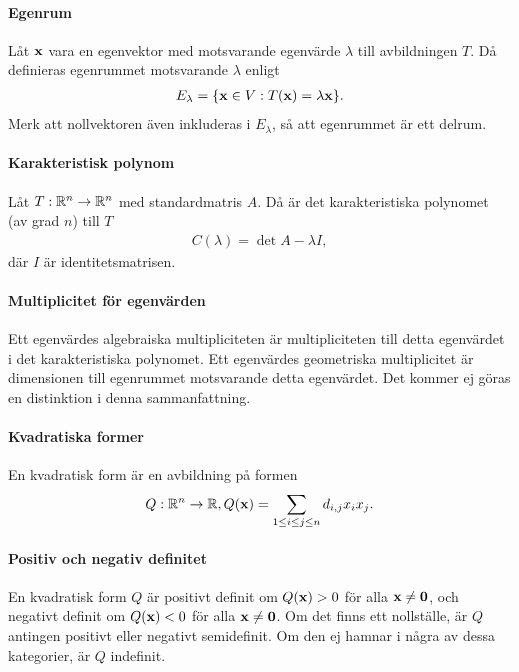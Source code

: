 \paragraph{Egenrum}
Låt $\vect{x}$ vara en egenvektor med motsvarande egenvärde $\lambda$ till avbildningen $T$. Då definieras egenrummet motsvarande $\lambda$ enligt
\begin{align*}
	E_\lambda = \{\vect{x}\in V: T(\vect{x}) = \lambda\vect{x}\}.
\end{align*}
Merk att nollvektoren även inkluderas i $E_\lambda$, så att egenrummet är ett delrum.

\paragraph{Karakteristisk polynom}
Låt $T: \mathbb{R}^n\to\mathbb{R}^n$ med standardmatris $A$. Då är det karakteristiska polynomet (av grad $n$) till $T$
\begin{align*}
	C(\lambda) = \det{A - \lambda I},
\end{align*}
där $I$ är identitetsmatrisen.

\paragraph{Multiplicitet för egenvärden}
Ett egenvärdes algebraiska multipliciteten är multipliciteten till detta egenvärdet i det karakteristiska polynomet. Ett egenvärdes geometriska multiplicitet är dimensionen till egenrummet motsvarande detta egenvärdet. Det kommer ej göras en distinktion i denna sammanfattning.

\paragraph{Kvadratiska former}
En kvadratisk form är en avbildning på formen
\begin{align*}
	Q: \R^n\to\R, Q(\vect{x}) = \sum\limits_{1\leq i\leq j\leq n}d_{i, j}x_ix_j.
\end{align*}

\paragraph{Positiv och negativ definitet}
En kvadratisk form $Q$ är positivt definit om $Q(\vect{x}) > 0$ för alla $\vect{x}\neq\vect{0}$, och negativt definit om $Q(\vect{x}) < 0$ för alla $\vect{x}\neq\vect{0}$. Om det finns ett nollställe, är $Q$ antingen positivt eller negativt semidefinit. Om den ej hamnar i några av dessa kategorier, är $Q$ indefinit.

